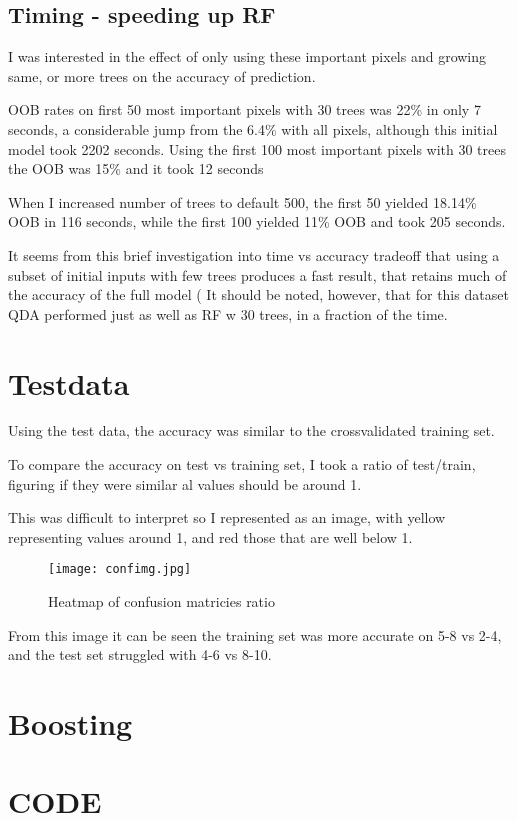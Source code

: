 \documentclass[12pt]{article}
\begin{document}
		\subsection{Timing - speeding up RF}
		I was interested in the effect of only using these important pixels and growing same, or more trees on the accuracy of prediction.


		OOB rates on first 50 most important pixels with 30 trees was 22\% in only 7 seconds, a considerable jump from the 6.4\% with all pixels, although this initial model took 2202 seconds.
		Using the first 100 most important pixels with 30 trees the OOB was 15\% and it took 12 seconds

		When I increased number of trees to default 500, the first 50 yielded 18.14\% OOB in 116 seconds, while the first 100 yielded 11\% OOB and took 205 seconds.


		It seems from this brief investigation into time vs accuracy tradeoff that using a subset of initial inputs with few trees produces a fast result, that retains much of the accuracy of the full model ( It should be noted, however, that for this dataset QDA performed just as well as RF w 30 trees, in a fraction of the time.

		\section{Testdata}
		Using the test data, the accuracy was similar to the crossvalidated training set.
		

		To compare the accuracy on test vs training set, I took a ratio of test/train, figuring if they were similar al values should be around 1.
		

		This was difficult to interpret so I represented as an image, with yellow representing values around 1, and red those that are well below 1.

			\begin{figure}[H]
				\centering
				\texttt{[image: confimg.jpg]}
				\caption{Heatmap of confusion matricies ratio}
			\end{figure}

		From this image it can be seen the training set was more accurate on 5-8 vs 2-4, and the test set struggled with 4-6 vs 8-10.

		\section{Boosting}


			
\newpage
	\section{CODE}
		
\end{document}
